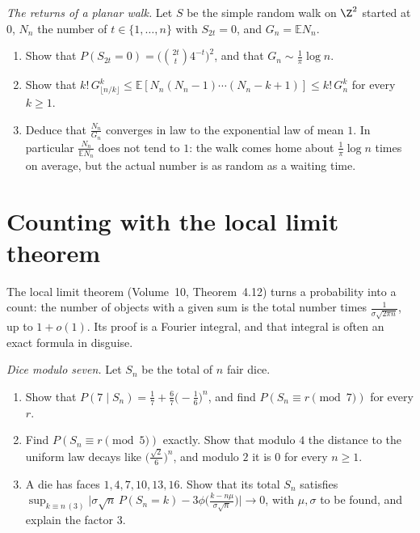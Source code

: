 \begin{exercise}[$\star\star\star$]\label{pb:erdostaylor}
\emph{The returns of a planar walk.} Let $S$ be the simple random walk on $\Z^2$ started at $0$, $N_n$ the number of $t\in\{1,\dots,n\}$ with $S_{2t}=0$, and
$G_n=\mathbb EN_n$.
\begin{enumerate}[label=(\alph*)]
\item Show that $P(S_{2t}=0)=\bigl(\binom{2t}t4^{-t}\bigr)^2$, and that $G_n\sim\frac1\pi\log n$.
\item Show that $k!\,G_{\lfloor n/k\rfloor}^k\le\mathbb E[N_n(N_n-1)\cdots(N_n-k+1)]\le k!\,G_n^k$ for every $k\ge1$.
\item Deduce that $\frac{N_n}{G_n}$ converges in law to the exponential law of mean $1$. In particular $\frac{N_n}{\mathbb EN_n}$ does not tend to $1$: the walk comes home
about $\frac1\pi\log n$ times on average, but the actual number is as random as a waiting time.
\end{enumerate}
\end{exercise}

\section{Counting with the local limit theorem}

The local limit theorem (Volume~10, Theorem~4.12) turns a probability into a count: the number of objects with a given sum is the total number times
$\frac{1}{\sigma\sqrt{2\pi n}}$, up to $1+o(1)$. Its proof is a Fourier integral, and that integral is often an exact formula in disguise.

\begin{exercise}[$\star$]\label{pb:dice}
\emph{Dice modulo seven.} Let $S_n$ be the total of $n$ fair dice.
\begin{enumerate}[label=(\alph*)]
\item Show that $P(7\mid S_n)=\frac17+\frac67\bigl(-\frac16\bigr)^n$, and find $P(S_n\equiv r\pmod7)$ for every $r$.
\item Find $P(S_n\equiv r\pmod5)$ exactly. Show that modulo $4$ the distance to the uniform law decays like $\bigl(\frac{\sqrt2}6\bigr)^n$, and modulo $2$ it is $0$ for
every $n\ge1$.
\item A die has faces $1,4,7,10,13,16$. Show that its total $S_n$ satisfies $\sup_{k\equiv n\,(3)}\bigl|\sigma\sqrt n\,P(S_n=k)-3\phi\bigl(\frac{k-n\mu}{\sigma\sqrt n}\bigr)\bigr|\to0$,
with $\mu,\sigma$ to be found, and explain the factor $3$.
\end{enumerate}
\end{exercise}

